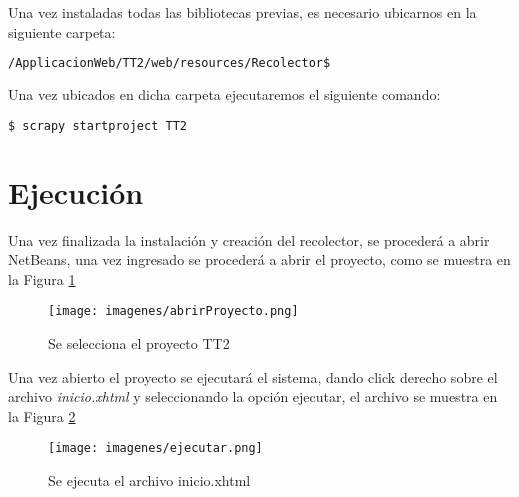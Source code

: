 	Una vez instaladas todas las bibliotecas previas, es necesario ubicarnos en la siguiente carpeta:
	\begin{lstlisting}[language=bash]
		/ApplicacionWeb/TT2/web/resources/Recolector$
	\end{lstlisting}
	Una vez ubicados en dicha carpeta ejecutaremos el siguiente comando:
	\begin{lstlisting}[language=bash]
		$ scrapy startproject TT2
	\end{lstlisting}
	
\section{Ejecución}
Una vez finalizada la instalación y creación del recolector, se procederá a abrir NetBeans, una vez ingresado se procederá a abrir el proyecto, como se muestra en la Figura \ref{fig:seleccionarProyecto}
\begin{figure}[H]
	\centering
	\texttt{[image: imagenes/abrirProyecto.png]}
	\caption{Se selecciona el proyecto TT2}
	\label{fig:seleccionarProyecto}
\end{figure}

Una vez abierto el proyecto se ejecutará el sistema, dando click derecho sobre el archivo \textit{inicio.xhtml} y seleccionando la opción ejecutar, el archivo se muestra en la Figura \ref{fig:inicio}

\begin{figure}[H]
	\centering
	\texttt{[image: imagenes/ejecutar.png]}
	\caption{Se ejecuta el archivo inicio.xhtml}
	\label{fig:inicio}
\end{figure}